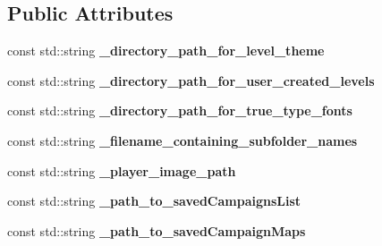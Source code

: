 \subsection*{Public Attributes}
\begin{DoxyCompactItemize}
\item 
\hypertarget{class_singleton_file_path_and_folder_manager_a7865eee86450b8406bbaf281271b2d4c}{}\label{class_singleton_file_path_and_folder_manager_a7865eee86450b8406bbaf281271b2d4c} 
const std\+::string {\bfseries \+\_\+directory\+\_\+path\+\_\+for\+\_\+level\+\_\+theme}
\item 
\hypertarget{class_singleton_file_path_and_folder_manager_a44eb54abfd0edf0af6852f9fc55dbe25}{}\label{class_singleton_file_path_and_folder_manager_a44eb54abfd0edf0af6852f9fc55dbe25} 
const std\+::string {\bfseries \+\_\+directory\+\_\+path\+\_\+for\+\_\+user\+\_\+created\+\_\+levels}
\item 
\hypertarget{class_singleton_file_path_and_folder_manager_a49e09e7147a23c4191940ad1b25e263d}{}\label{class_singleton_file_path_and_folder_manager_a49e09e7147a23c4191940ad1b25e263d} 
const std\+::string {\bfseries \+\_\+directory\+\_\+path\+\_\+for\+\_\+true\+\_\+type\+\_\+fonts}
\item 
\hypertarget{class_singleton_file_path_and_folder_manager_ac245e5c6b043cfcd725e1a84415972fa}{}\label{class_singleton_file_path_and_folder_manager_ac245e5c6b043cfcd725e1a84415972fa} 
const std\+::string {\bfseries \+\_\+filename\+\_\+containing\+\_\+subfolder\+\_\+names}
\item 
\hypertarget{class_singleton_file_path_and_folder_manager_a804996681de0abf7e537cad3c9db51c7}{}\label{class_singleton_file_path_and_folder_manager_a804996681de0abf7e537cad3c9db51c7} 
const std\+::string {\bfseries \+\_\+player\+\_\+image\+\_\+path}
\item 
\hypertarget{class_singleton_file_path_and_folder_manager_ac5a40bad0974d6e68215d074fcb8d5d9}{}\label{class_singleton_file_path_and_folder_manager_ac5a40bad0974d6e68215d074fcb8d5d9} 
const std\+::string {\bfseries \+\_\+path\+\_\+to\+\_\+saved\+Campaigns\+List}
\item 
\hypertarget{class_singleton_file_path_and_folder_manager_a474e75c750a6afd10e67c2b2dee1ea5c}{}\label{class_singleton_file_path_and_folder_manager_a474e75c750a6afd10e67c2b2dee1ea5c} 
const std\+::string {\bfseries \+\_\+path\+\_\+to\+\_\+saved\+Campaign\+Maps}
\item 
\hypertarget{class_singleton_file_path_and_folder_manager_ae2fcf2df11c463d941154fc30a365fcf}{}\label{class_singleton_file_path_and_folder_manager_ae2fcf2df11c463d941154fc30a365fcf} 

\end{DoxyCompactItemize}

